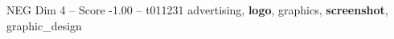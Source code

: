 \begin{textsample}{NEG Dim 4 – Score -1.00 – t011231}  \label{ex:f4_neg_036}
advertising, \textbf{logo}, graphics, \textbf{screenshot}, graphic\_design

\end{textsample}
